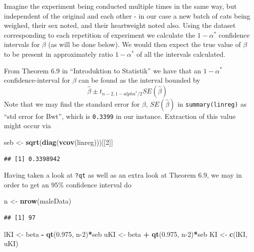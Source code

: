 \documentclass[
]{article}
\newenvironment{Shaded}{\begin{snugshade}}{\end{snugshade}}
\newcommand{\DecValTok}[1]{\textcolor[rgb]{0.00,0.00,0.81}{#1}}
\newcommand{\FloatTok}[1]{\textcolor[rgb]{0.00,0.00,0.81}{#1}}
\newcommand{\KeywordTok}[1]{\textcolor[rgb]{0.13,0.29,0.53}{\textbf{#1}}}
\newcommand{\NormalTok}[1]{#1}
\newcommand{\OperatorTok}[1]{\textcolor[rgb]{0.81,0.36,0.00}{\textbf{#1}}}
\newcommand{\StringTok}[1]{\textcolor[rgb]{0.31,0.60,0.02}{#1}}
\begin{document}
Imagine the experiment being conducted multiple times in the same way,
but independent of the original and each other - in our case a new batch
of cats being weighed, their sex noted, and their heartweight noted
also. Using the dataset corresponding to each repetition of experiment
we calculate the \(1-\alpha^*\) confidence intervals for \(\beta\) (as
will be done below). We would then expect the true value of \(\beta\) to
be present in approximately ratio \(1-\alpha^*\) of all the intervals
calculated.

From Theorem 6.9 in ``Introduktion to Statistik'' we have that an
\(1-\alpha^*\) confidence-interval for \(\beta\) can be found as the
interval bounded by \[\hat{\beta}\pm t_{n-2,1-alpha^*/2}SE(\hat\beta)\]
Note that we may find the standard error for \(\beta,\,SE(\hat\beta)\)
in \texttt{summary(linreg)} as ``std error for Bwt'', which is
\texttt{0.3399} in our instance. Extraction of this value might occur
via

\begin{Shaded}
\begin{Highlighting}[]
\NormalTok{seb <-}\StringTok{ }\KeywordTok{sqrt}\NormalTok{(}\KeywordTok{diag}\NormalTok{(}\KeywordTok{vcov}\NormalTok{(linreg)))[[}\DecValTok{2}\NormalTok{]]}
\end{Highlighting}
\end{Shaded}

\begin{verbatim}
## [1] 0.3398942
\end{verbatim}

Having taken a look at \texttt{?qt} as well as an extra look at Theorem
6.9, we may in order to get an \(95\%\) confidence interval do

\begin{Shaded}
\begin{Highlighting}[]
\NormalTok{n <-}\StringTok{ }\KeywordTok{nrow}\NormalTok{(maleData)}
\end{Highlighting}
\end{Shaded}

\begin{verbatim}
## [1] 97
\end{verbatim}

\begin{Shaded}
\begin{Highlighting}[]
\NormalTok{lKI <-}\StringTok{ }\NormalTok{beta }\OperatorTok{-}\StringTok{ }\KeywordTok{qt}\NormalTok{(}\FloatTok{0.975}\NormalTok{, n}\DecValTok{-2}\NormalTok{)}\OperatorTok{*}\NormalTok{seb}
\NormalTok{uKI <-}\StringTok{ }\NormalTok{beta }\OperatorTok{+}\StringTok{ }\KeywordTok{qt}\NormalTok{(}\FloatTok{0.975}\NormalTok{, n}\DecValTok{-2}\NormalTok{)}\OperatorTok{*}\NormalTok{seb}
\NormalTok{KI <-}\StringTok{ }\KeywordTok{c}\NormalTok{(lKI, uKI)}
\end{Highlighting}
\end{Shaded}
\end{document}
